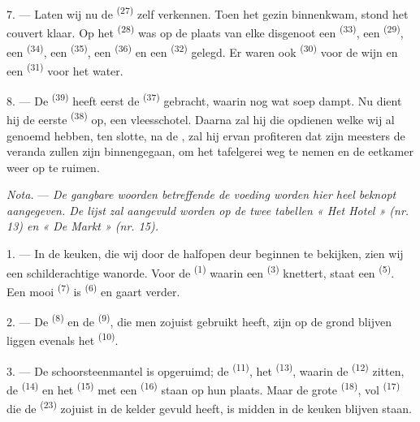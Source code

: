 7. --- Laten wij nu de  \textsuperscript{(27)} zelf verkennen. Toen het gezin
binnenkwam, stond het couvert klaar. Op het  \textsuperscript{(28)} was op
de plaats van elke disgenoot een  \textsuperscript{(33)}, een 
\textsuperscript{(29)}, een
 \textsuperscript{(34)}, een 
\textsuperscript{(35)}, een  \textsuperscript{(36)} en een
 \textsuperscript{(32)} gelegd. Er waren ook 
\textsuperscript{(30)} voor de wijn en een  \textsuperscript{(31)} voor het
water.

8. --- De  \textsuperscript{(39)} heeft eerst de
 \textsuperscript{(37)} gebracht, waarin nog wat soep
dampt. Nu dient hij de eerste  \textsuperscript{(38)} op, een vleesschotel.
Daarna zal hij die opdienen welke wij al genoemd hebben, ten slotte, na de
, zal hij ervan profiteren dat zijn meesters de veranda zullen zijn
binnengegaan, om het tafelgerei weg te nemen en de eetkamer weer op te ruimen.

\textit{Nota.} --- \textit{De gangbare woorden betreffende de voeding worden hier heel beknopt
aangegeven. De lijst zal aangevuld worden op de twee tabellen « Het Hotel » (nr. 13) en « De
Markt » (nr. 15).}

\VUsaut{4.6mm}
\VUsaut{3.0mm}

1. --- In de keuken, die wij door de halfopen deur beginnen te bekijken, zien wij een
schilderachtige wanorde. Voor de  \textsuperscript{(1)} waarin een 
\textsuperscript{(3)} knettert, staat een
 \textsuperscript{(5)}. Een mooi 
\textsuperscript{(7)} is  \textsuperscript{(6)} en gaart verder.

2. --- De  \textsuperscript{(8)} en de 
\textsuperscript{(9)}, die men zojuist gebruikt heeft, zijn op de grond blijven liggen evenals
het  \textsuperscript{(10)}.

3. --- De schoorsteenmantel is opgeruimd; de  \textsuperscript{(11)}, het
 \textsuperscript{(13)}, waarin de 
\textsuperscript{(12)} zitten, de
 \textsuperscript{(14)} en het 
\textsuperscript{(15)} met een  \textsuperscript{(16)} staan op hun plaats. Maar
de grote  \textsuperscript{(18)}, vol
 \textsuperscript{(17)} die de 
\textsuperscript{(23)} zojuist in de kelder gevuld heeft, is midden in de keuken blijven
staan.

